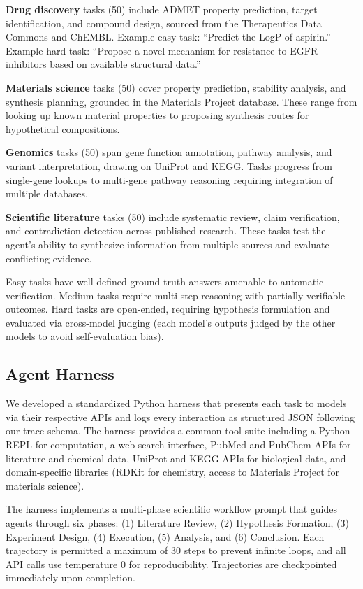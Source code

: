 \documentclass{article}
\begin{document}
\textbf{Drug discovery} tasks (50) include ADMET property prediction, target identification, and compound design, sourced from the Therapeutics Data Commons and ChEMBL. Example easy task: ``Predict the LogP of aspirin.'' Example hard task: ``Propose a novel mechanism for resistance to EGFR inhibitors based on available structural data.''

\textbf{Materials science} tasks (50) cover property prediction, stability analysis, and synthesis planning, grounded in the Materials Project database. These range from looking up known material properties to proposing synthesis routes for hypothetical compositions.

\textbf{Genomics} tasks (50) span gene function annotation, pathway analysis, and variant interpretation, drawing on UniProt and KEGG. Tasks progress from single-gene lookups to multi-gene pathway reasoning requiring integration of multiple databases.

\textbf{Scientific literature} tasks (50) include systematic review, claim verification, and contradiction detection across published research. These tasks test the agent's ability to synthesize information from multiple sources and evaluate conflicting evidence.

Easy tasks have well-defined ground-truth answers amenable to automatic verification. Medium tasks require multi-step reasoning with partially verifiable outcomes. Hard tasks are open-ended, requiring hypothesis formulation and evaluated via cross-model judging (each model's outputs judged by the other models to avoid self-evaluation bias).

\subsection{Agent Harness}
\label{sec:harness}

We developed a standardized Python harness that presents each task to models via their respective APIs and logs every interaction as structured JSON following our trace schema. The harness provides a common tool suite including a Python REPL for computation, a web search interface, PubMed and PubChem APIs for literature and chemical data, UniProt and KEGG APIs for biological data, and domain-specific libraries (RDKit for chemistry, access to Materials Project for materials science).

The harness implements a multi-phase scientific workflow prompt that guides agents through six phases: (1) Literature Review, (2) Hypothesis Formation, (3) Experiment Design, (4) Execution, (5) Analysis, and (6) Conclusion. Each trajectory is permitted a maximum of 30 steps to prevent infinite loops, and all API calls use temperature 0 for reproducibility. Trajectories are checkpointed immediately upon completion.
\end{document}
